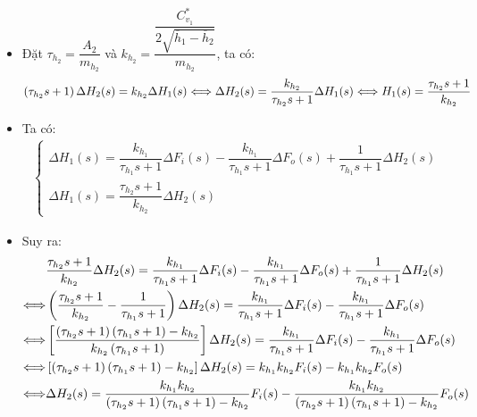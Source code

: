 \begin{itemize}
\begin{align*}
            \end{align*}
        \item Đặt $\tau_{h_2} = \dfrac{A_2}{m_{h_2}}$ và $k_{h_2} = \dfrac{\dfrac{C_{v_1}^{*}}{2\sqrt{\overline{h}_1 - \overline{h}_2}}}{m_{h_2}}$, ta có:
            \begin{align*}
                \left({\tau_{h_2}s + 1}\right) \Delta H_2(s) = k_{h_2} \Delta H_1(s) \Longleftrightarrow \Delta H_2(s) = \dfrac{k_{h_2}}{\tau_{h_2}s + 1} \Delta H_1(s) \Longleftrightarrow H_1(s) = \dfrac{\tau_{h_2}s + 1}{k_{h_2}}
            \end{align*}
        \item Ta có:
            \begin{align*}
                \left\{\begin{array}{l}
                    \Delta H_1(s) = \dfrac{k_{h_1}}{\tau_{h_1} s + 1} \Delta F_i(s) - \dfrac{k_{h_1}}{\tau_{h_1} s + 1} \Delta F_o (s) + \dfrac{1}{\tau_{h_1} s + 1}\Delta H_2(s) \\ [.5cm]
                    \Delta H_1(s) = \dfrac{\tau_{h_2}s + 1}{k_{h_2}} \Delta H_2(s)
                \end{array}\right.
            \end{align*}
        \item Suy ra:
            \begin{align*}
                & \dfrac{\tau_{h_2}s + 1}{k_{h_2}} \Delta H_2(s) = \dfrac{k_{h_1}}{\tau_{h_1} s + 1} \Delta F_i(s) - \dfrac{k_{h_1}}{\tau_{h_1} s + 1} \Delta F_o (s) + \dfrac{1}{\tau_{h_1} s + 1}\Delta H_2(s) \\
                \Longleftrightarrow & \pfm{\dfrac{\tau_{h_2}s + 1}{k_{h_2}} - \dfrac{1}{\tau_{h_1} s + 1}} \Delta H_2(s) = \dfrac{k_{h_1}}{\tau_{h_1} s + 1} \Delta F_i(s) - \dfrac{k_{h_1}}{\tau_{h_1} s + 1} \Delta F_o (s) \\
                \Longleftrightarrow & \pfs{\dfrac{\pfm{\tau_{h_2}s + 1}\pfm{\tau_{h_1} s + 1} - k_{h_2}}{k_{h_2}\pfm{\tau_{h_1} s + 1}}} \Delta H_2(s) = \dfrac{k_{h_1}}{\tau_{h_1} s + 1} \Delta F_i(s) - \dfrac{k_{h_1}}{\tau_{h_1} s + 1} \Delta F_o (s) \\
                \Longleftrightarrow & \pfs{\pfm{\tau_{h_2}s + 1}\pfm{\tau_{h_1} s + 1} - k_{h_2}} \Delta H_2(s) = k_{h_1} k_{h_2} F_i(s) - k_{h_1} k_{h_2} F_o(s) \\
                \Longleftrightarrow & \Delta H_2(s) = \frac{k_{h_1} k_{h_2}}{\pfm{\tau_{h_2}s + 1}\pfm{\tau_{h_1} s + 1} - k_{h_2}} F_i(s) - \frac{k_{h_1} k_{h_2}}{\pfm{\tau_{h_2}s + 1}\pfm{\tau_{h_1} s + 1} - k_{h_2}} F_o(s)

\end{align*}
\end{itemize}

